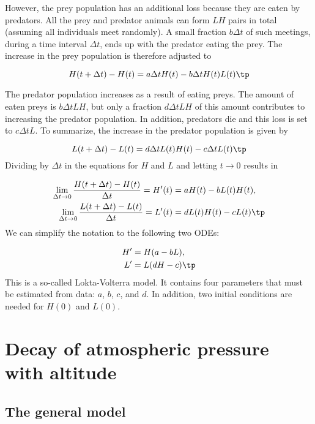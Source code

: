 \documentclass[graybox,sectrefs,envcountresetchap,open=right,final]{svmonodo}
\begin{document}
However, the prey population has an additional loss because they
are eaten by predators. All the prey and predator animals can form
$LH$ pairs in total (assuming all individuals meet randomly).
A small fraction $b\Delta t$
of such meetings, during a time interval $\Delta t$,
ends up with the predator eating the prey. The increase in the prey
population is therefore adjusted to

\[ H(t+\Delta t) - H(t) =  a\Delta t H(t) - b\Delta t H(t)L(t)\tp\]

The predator population increases as a result of eating preys.
The amount of eaten preys is $b\Delta t LH$, but only a fraction
$d\Delta t LH$ of this amount contributes to increasing the
predator population. In addition, predators die and this loss
is set to $c\Delta t L$. To summarize, the increase in the predator
population is given by

\[ L(t + \Delta t) - L(t) = d\Delta t L(t)H(t) - c\Delta t L(t)\tp\]
Dividing by $\Delta t$ in the equations for $H$ and $L$ and letting
$t\rightarrow 0$ results in

\begin{align*}
\lim_{\Delta t\rightarrow 0}\frac{H(t+\Delta t)-H(t)}{\Delta t}
= H^{\prime}(t) &= aH(t) - bL(t)H(t),\\ 
\lim_{\Delta t\rightarrow 0}\frac{L(t+\Delta t)-L(t)}{\Delta t}
= L^{\prime}(t) &= dL(t)H(t) - cL(t)\tp
\end{align*}
We can simplify the notation to the following two ODEs:

\begin{align}
H^{\prime} &= H(a - bL),
\label{decay:app:predprey:eqH}\\ 
L^{\prime} &= L(dH - c)\tp
\label{decay:app:predprey:eqL}
\end{align}
This is a so-called Lokta-Volterra model. It contains four parameters
that must be estimated from data: $a$, $b$, $c$, and $d$. In addition, two
initial conditions are needed for $H(0)$ and $L(0)$.

\section{Decay of atmospheric pressure with altitude}
\label{decay:app:atm}


\subsection{The general model}
\end{document}
